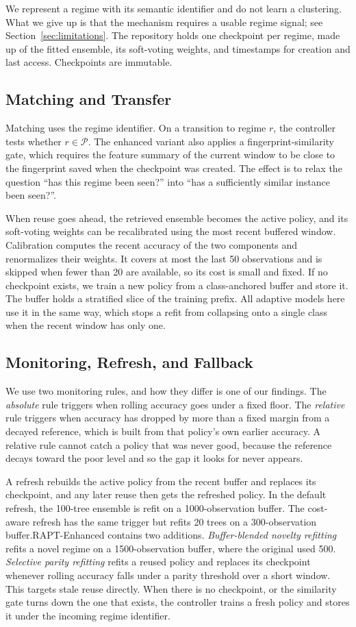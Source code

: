 \documentclass[conference]{IEEEtran}
\begin{document}
We represent a regime with its semantic identifier and do not learn a clustering.  What we give up is that
the mechanism requires a usable regime signal; see Section~\ref{sec:limitations}. The
repository holds one checkpoint per regime, made up of the fitted ensemble, its
soft-voting weights, and timestamps for creation and last access. Checkpoints are
immutable.


\subsection{Matching and Transfer}
Matching uses the regime identifier. On a transition to regime $r$, the controller tests
whether $r \in \mathcal{P}$. The enhanced variant also applies a fingerprint-similarity
gate, which requires the feature summary of the current window to be close to the
fingerprint saved when the checkpoint was created. The effect is to relax the question
``has this regime been seen?'' into ``has a sufficiently similar instance been seen?''.


When reuse goes ahead, the retrieved ensemble becomes the active policy, and its
soft-voting weights can be recalibrated using the most recent buffered window.
Calibration computes the recent accuracy of the two components and renormalizes their
weights. It covers at most the last 50 observations and is skipped when fewer than 20
are available, so its cost is small and fixed. If no checkpoint exists, we train a new
policy from a class-anchored buffer and store it. The buffer holds a stratified slice of
the training prefix. All adaptive models here use it in the same way, which stops a
refit from collapsing onto a single class when the recent window has only one.


\subsection{Monitoring, Refresh, and Fallback}
We use two monitoring rules, and how they differ is one of our findings. The
\emph{absolute} rule triggers when rolling accuracy goes under a fixed floor. The
\emph{relative} rule triggers when accuracy has dropped by more than a fixed margin from
a decayed reference, which is built from that policy's own earlier accuracy.
 A relative rule cannot catch a
policy that was never good, because the reference decays toward the poor level and so
the gap it looks for never appears.


A refresh rebuilds the active policy from the recent buffer and replaces its checkpoint,
and any later reuse then gets the refreshed policy. In the default refresh, the
100-tree ensemble is refit on a 1000-observation buffer. The cost-aware refresh has the
same trigger but refits 20 trees on a 300-observation buffer.RAPT-Enhanced contains two additions. \emph{Buffer-blended novelty refitting} refits a
novel regime on a 1500-observation buffer, where the original used 500.
\emph{Selective parity refitting} refits a reused policy and replaces its checkpoint
whenever rolling accuracy falls under a parity threshold over a short window. This
targets stale reuse directly.  When there is no checkpoint, or the similarity gate
turns down the one that exists, the controller trains a fresh policy and stores it under
the incoming regime identifier. 
\end{document}
